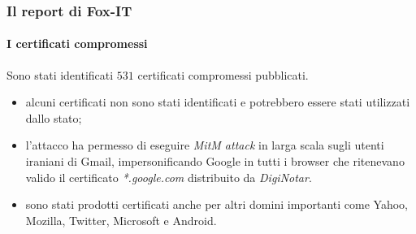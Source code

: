 \documentclass{beamer}
\begin{document}
\begin{frame}
\frametitle{Il report di Fox-IT}
\framesubtitle{I certificati compromessi}

\begin{minipage}[t]{0.75\textwidth}
	\hspace{0.2cm}
	
	Sono stati identificati $531$ certificati compromessi pubblicati.
	\begin{itemize}
		\item alcuni \alert{certificati non} sono stati \alert{identificati} e potrebbero essere stati utilizzati dallo stato;
		\item l'attacco ha permesso di eseguire \alert{\textit{MitM attack}} in larga scala sugli utenti iraniani di \alert{Gmail}, impersonificando Google in tutti i browser che ritenevano valido il certificato \alert{\textit{*.google.com}} distribuito da \textit{DigiNotar}.
		\item sono stati prodotti certificati anche per altri domini importanti come \alert{Yahoo}, \alert{Mozilla}, \alert{Twitter}, \alert{Microsoft} e \alert{Android}.
	\end{itemize}
\end{minipage}
\begin{minipage}[t]{0.23\textwidth}
	\begin{figure}[H]
		\centering

\end{figure}
\end{minipage}
\end{frame}
\end{document}
